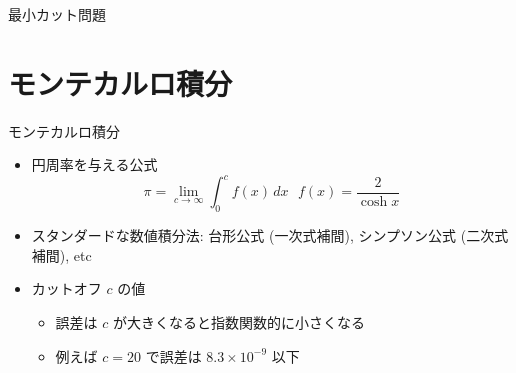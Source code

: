 \documentclass[dvipdfmx]{beamer}
\begin{document}
\begin{frame}[t,fragile]{最小カット問題}
\end{frame}

\section{モンテカルロ積分}

\begin{frame}[t,fragile]{モンテカルロ積分}
  \begin{itemize}
    \setlength{\itemsep}{1em}
  \item 円周率を与える公式
    \[
    \pi = \lim_{c \rightarrow \infty} \int_0^c f(x) \, dx \ \ \ f(x) = \frac{2}{\cosh x}
    \]
  \item スタンダードな数値積分法: 台形公式 (一次式補間), シンプソン公式 (二次式補間), etc
  \item カットオフ $c$ の値
    \begin{itemize}
    \item 誤差は $c$ が大きくなると指数関数的に小さくなる
    \item 例えば $c = 20$ で誤差は $8.3 \times 10^{-9}$ 以下
    \end{itemize}
  \end{itemize}
\end{frame}
\end{document}
